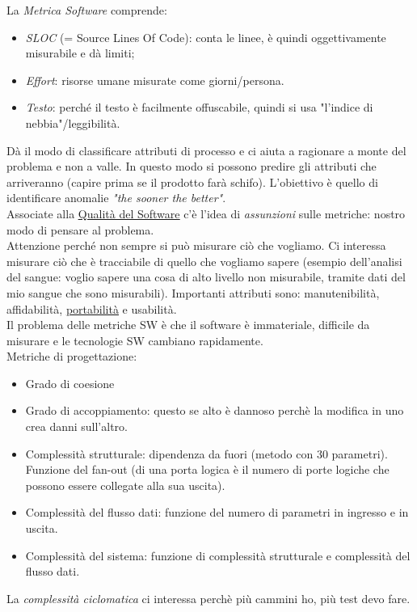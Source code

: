 		La \textit{Metrica Software} comprende:
			\begin{itemize}
				\item \textit{SLOC} (= Source Lines Of Code): conta le linee, è quindi oggettivamente misurabile e dà limiti;
				\item \textit{Effort}: risorse umane misurate come giorni/persona.
				\item \textit{Testo}: perché il testo è facilmente offuscabile, quindi si usa "l'indice di nebbia"/leggibilità.
			\end{itemize}
		Dà il modo di classificare attributi di processo e ci aiuta a ragionare a monte del problema e non a valle. In questo modo si possono predire gli attributi che arriveranno (capire prima se il prodotto farà schifo). L'obiettivo è quello di identificare anomalie \textit{"the sooner the better"}. \\
		Associate alla \underline{\hyperref[qualita]{Qualità del Software}} c'è l'idea di \textit{assunzioni} sulle metriche: nostro modo di pensare al problema. \\
		Attenzione perché non sempre si può misurare ciò che vogliamo. Ci interessa misurare ciò che è tracciabile di quello che vogliamo sapere (esempio dell'analisi del sangue: voglio sapere una cosa di alto livello non misurabile, tramite dati del mio sangue che sono misurabili). Importanti attributi sono: manutenibilità, affidabilità, \underline{\hyperref[portabilita]{portabilità}} e usabilità.\\
		Il problema delle metriche SW è che il software è immateriale, difficile da misurare e le tecnologie SW cambiano rapidamente. \\
		Metriche di progettazione:
		\begin{itemize}
			\item Grado di coesione
			\item Grado di accoppiamento: questo se alto è dannoso perchè la modifica in uno crea danni sull'altro.
			\item Complessità strutturale: dipendenza da fuori (metodo con 30 parametri). Funzione del fan-out (di una porta logica è il numero di porte logiche che possono essere collegate alla sua uscita).
			\item Complessità del flusso dati: funzione del numero di parametri in ingresso e in uscita.
			\item Complessità del sistema: funzione di complessità strutturale e complessità del flusso dati.
		\end{itemize}
		La \textit{complessità ciclomatica} ci interessa perchè più cammini ho, più test devo fare.


